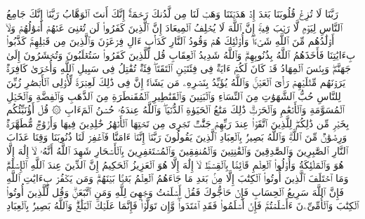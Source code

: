 \startbuffer[\q:3:8]
رَبَّنَا لَا تُزِغۡ قُلُوبَنَا بَعۡدَ إِذۡ هَدَیۡتَنَا وَهَبۡ لَنَا مِن لَّدُنكَ رَحۡمَةًۚ إِنَّكَ أَنتَ ٱلۡوَهَّابُ%
\stopbuffer%
\startbuffer[\q:3:9]
رَبَّنَاۤ إِنَّكَ جَامِعُ ٱلنَّاسِ لِیَوۡمࣲ لَّا رَیۡبَ فِیهِۚ إِنَّ ٱللَّهَ لَا یُخۡلِفُ ٱلۡمِیعَادَ%
\stopbuffer%
\startbuffer[\q:3:10]
إِنَّ ٱلَّذِینَ كَفَرُوا۟ لَن تُغۡنِیَ عَنۡهُمۡ أَمۡوَٰلُهُمۡ وَلَاۤ أَوۡلَٰدُهُم مِّنَ ٱللَّهِ شَیۡءࣰاۖ وَأُو۟لَٰۤئِكَ هُمۡ وَقُودُ ٱلنَّارِ%
\stopbuffer%
\startbuffer[\q:3:11]
كَدَأۡبِ ءَالِ فِرۡعَوۡنَ وَٱلَّذِینَ مِن قَبۡلِهِمۡۚ كَذَّبُوا۟ بِءَایَٰتِنَا فَأَخَذَهُمُ ٱللَّهُ بِذُنُوبِهِمۡۗ وَٱللَّهُ شَدِیدُ ٱلۡعِقَابِ%
\stopbuffer%
\startbuffer[\q:3:12]
قُل لِّلَّذِینَ كَفَرُوا۟ سَتُغۡلَبُونَ وَتُحۡشَرُونَ إِلَىٰ جَهَنَّمَۖ وَبِئۡسَ ٱلۡمِهَادُ%
\stopbuffer%
\startbuffer[\q:3:13]
قَدۡ كَانَ لَكُمۡ ءَایَةࣱ فِی فِئَتَیۡنِ ٱلۡتَقَتَاۖ فِئَةࣱ تُقَٰتِلُ فِی سَبِیلِ ٱللَّهِ وَأُخۡرَىٰ كَافِرَةࣱ یَرَوۡنَهُم مِّثۡلَیۡهِمۡ رَأۡیَ ٱلۡعَیۡنِۚ وَٱللَّهُ یُؤَیِّدُ بِنَصۡرِهِۦ مَن یَشَاۤءُۚ إِنَّ فِی ذَٰلِكَ لَعِبۡرَةࣰ لِّأُو۟لِی ٱلۡأَبۡصَٰرِ%
\stopbuffer%
\startbuffer[\q:3:14]
زُیِّنَ لِلنَّاسِ حُبُّ ٱلشَّهَوَٰتِ مِنَ ٱلنِّسَاۤءِ وَٱلۡبَنِینَ وَٱلۡقَنَٰطِیرِ ٱلۡمُقَنطَرَةِ مِنَ ٱلذَّهَبِ وَٱلۡفِضَّةِ وَٱلۡخَیۡلِ ٱلۡمُسَوَّمَةِ وَٱلۡأَنۡعَٰمِ وَٱلۡحَرۡثِۗ ذَٰلِكَ مَتَٰعُ ٱلۡحَیَوٰةِ ٱلدُّنۡیَاۖ وَٱللَّهُ عِندَهُۥ حُسۡنُ ٱلۡمَءَابِ%
\stopbuffer%
\startbuffer[\q:3:15]
۞ قُلۡ أَؤُنَبِّئُكُم بِخَیۡرࣲ مِّن ذَٰلِكُمۡۖ لِلَّذِینَ ٱتَّقَوۡا۟ عِندَ رَبِّهِمۡ جَنَّٰتࣱ تَجۡرِی مِن تَحۡتِهَا ٱلۡأَنۡهَٰرُ خَٰلِدِینَ فِیهَا وَأَزۡوَٰجࣱ مُّطَهَّرَةࣱ وَرِضۡوَٰنࣱ مِّنَ ٱللَّهِۗ وَٱللَّهُ بَصِیرُۢ بِٱلۡعِبَادِ%
\stopbuffer%
\startbuffer[\q:3:16]
ٱلَّذِینَ یَقُولُونَ رَبَّنَاۤ إِنَّنَاۤ ءَامَنَّا فَٱغۡفِرۡ لَنَا ذُنُوبَنَا وَقِنَا عَذَابَ ٱلنَّارِ%
\stopbuffer%
\startbuffer[\q:3:17]
ٱلصَّٰبِرِینَ وَٱلصَّٰدِقِینَ وَٱلۡقَٰنِتِینَ وَٱلۡمُنفِقِینَ وَٱلۡمُسۡتَغۡفِرِینَ بِٱلۡأَسۡحَارِ%
\stopbuffer%
\startbuffer[\q:3:18]
شَهِدَ ٱللَّهُ أَنَّهُۥ لَاۤ إِلَٰهَ إِلَّا هُوَ وَٱلۡمَلَٰۤئِكَةُ وَأُو۟لُوا۟ ٱلۡعِلۡمِ قَاۤئِمَۢا بِٱلۡقِسۡطِۚ لَاۤ إِلَٰهَ إِلَّا هُوَ ٱلۡعَزِیزُ ٱلۡحَكِیمُ%
\stopbuffer%
\startbuffer[\q:3:19]
إِنَّ ٱلدِّینَ عِندَ ٱللَّهِ ٱلۡإِسۡلَٰمُۗ وَمَا ٱخۡتَلَفَ ٱلَّذِینَ أُوتُوا۟ ٱلۡكِتَٰبَ إِلَّا مِنۢ بَعۡدِ مَا جَاۤءَهُمُ ٱلۡعِلۡمُ بَغۡیَۢا بَیۡنَهُمۡۗ وَمَن یَكۡفُرۡ بِءَایَٰتِ ٱللَّهِ فَإِنَّ ٱللَّهَ سَرِیعُ ٱلۡحِسَابِ%
\stopbuffer%
\startbuffer[\q:3:20]
فَإِنۡ حَاۤجُّوكَ فَقُلۡ أَسۡلَمۡتُ وَجۡهِیَ لِلَّهِ وَمَنِ ٱتَّبَعَنِۗ وَقُل لِّلَّذِینَ أُوتُوا۟ ٱلۡكِتَٰبَ وَٱلۡأُمِّیِّۦنَ ءَأَسۡلَمۡتُمۡۚ فَإِنۡ أَسۡلَمُوا۟ فَقَدِ ٱهۡتَدَوا۟ۖ وَّإِن تَوَلَّوۡا۟ فَإِنَّمَا عَلَیۡكَ ٱلۡبَلَٰغُۗ وَٱللَّهُ بَصِیرُۢ بِٱلۡعِبَادِ%
